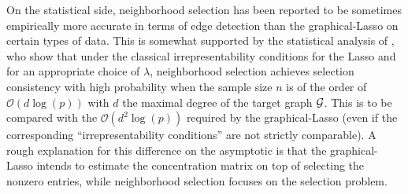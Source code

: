 On the statistical side, neighborhood selection has been reported to
be sometimes empirically more accurate in terms of edge detection than
the graphical-Lasso \cite{2008_SAGM_Villers,2008_preprint_Rocha} on
certain types of data.  This is somewhat supported by the statistical
analysis of \cite{2011_EJS_Ravikumar}, who show that under the
classical irrepresentability conditions for the Lasso
\cite{2006_JMLR_Zhao,2006_AS_Meinshausen} and for an appropriate
choice of $\lambda$, neighborhood selection achieves selection
consistency with high probability when the sample size $n$ is of the
order of $\mathcal{O}(d\log(p))$ with $d$ the maximal degree of the
target graph $\mathcal{G}$.  This is to be compared with the
$\mathcal{O}(d^2\log(p))$ required by the graphical-Lasso (even if the
corresponding ``irrepresentability conditions'' are not strictly
comparable).  A rough explanation for this difference on the
asymptotic is that the graphical-Lasso intends to estimate the
concentration matrix on top of selecting the nonzero entries, while
neighborhood selection focuses on the selection problem.


